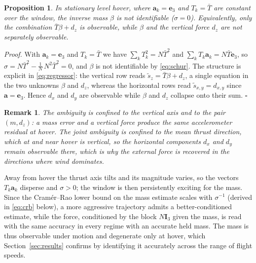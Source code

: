 \documentclass[lettersize,journal]{IEEEtran}
\newtheorem{proposition}{Proposition}
\newtheorem{remark}{Remark}
\renewenvironment{proof}{\noindent\textit{Proof.}}{\hfill$\square$\medskip}
\newcommand{\vect}[1]{\bm{#1}}
\newcommand{\mat}[1]{\mathbf{#1}}
\begin{document}
\begin{proposition}\label{prop:hover}
In stationary level hover, where $\vect{a}_k=\vect{e}_3$ and $T_k=\bar{T}$ are
constant over the window, the inverse mass $\beta$ is not identifiable
($\sigma=0$). Equivalently, only the combination $\bar{T}\beta+d_z$ is
observable, while $\beta$ and the vertical force $d_z$ are not separately
observable.
\end{proposition}
\begin{proof}
With $\vect{a}_k=\vect{e}_3$ and $T_k=\bar{T}$ we have $\sum_k T_k^2=N\bar{T}^2$
and $\sum_k T_k\vect{a}_k=N\bar{T}\vect{e}_3$, so
$\sigma = N\bar{T}^2-\tfrac{1}{N}\,N^2\bar{T}^2 = 0$, and $\beta$ is not
identifiable by \eqref{eq:schur}. The structure is explicit in
\eqref{eq:regressor}: the vertical row reads
$\tilde{s}_z=\bar{T}\beta+d_z$, a single equation in the two unknowns
$\beta$ and $d_z$, whereas the horizontal rows read
$\tilde{s}_{x,y}=d_{x,y}$ since $\vect{a}=\vect{e}_3$. Hence $d_x$ and $d_y$ are
observable while $\beta$ and $d_z$ collapse onto their sum.
\end{proof}

\begin{remark}
The ambiguity is confined to the vertical axis and to the pair $(m,d_z)$: a
mass error and a vertical force produce the same accelerometer residual at
hover. The joint ambiguity is confined to the mean thrust direction, which at
and near hover is vertical, so the horizontal components $d_x$ and $d_y$ remain
observable there, which is why the external force is recovered in the directions
where wind dominates.
\end{remark}

Away from hover the thrust axis tilts and its magnitude varies, so the vectors
$T_k\vect{a}_k$ disperse and $\sigma>0$; the window is then persistently exciting for
the mass. Since the Cram\'er--Rao lower bound on
the mass estimate scales with $\sigma^{-1}$ (derived in \eqref{eq:crb} below), a
more aggressive trajectory admits a better-conditioned estimate, while the force,
conditioned by the block
$N\mat{I}_3$ given the mass, is read with the same accuracy in every regime with
an accurate held mass. The mass is thus
observable under motion and degenerate only at hover, which
Section~\ref{sec:results} confirms by identifying it accurately across the range
of flight speeds.
\end{document}
